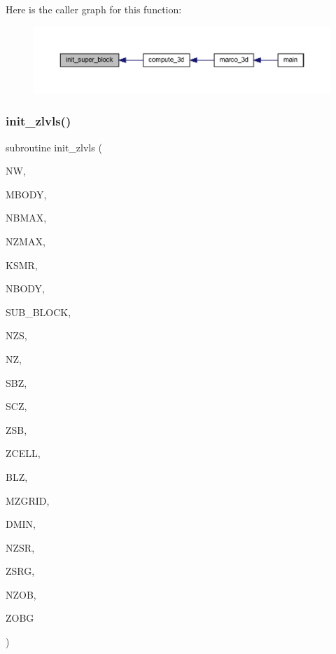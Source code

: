 Here is the caller graph for this function\+:
\nopagebreak
\begin{figure}[H]
\begin{center}
\leavevmode
\includegraphics[width=350pt]{Marco_8f90_ac268fba86b567389312bb1f5945bec19_icgraph}
\end{center}
\end{figure}
\mbox{\label{Marco_8f90_a4052ce4c8e8ce6ad657a5430196fb520}} 
\subsubsection{\texorpdfstring{init\+\_\+zlvls()}{init\_zlvls()}}
{\footnotesize\ttfamily subroutine init\+\_\+zlvls (\begin{DoxyParamCaption}\item[{integer, intent(in)}]{NW,  }\item[{integer, intent(in)}]{M\+B\+O\+DY,  }\item[{integer, intent(in)}]{N\+B\+M\+AX,  }\item[{integer, intent(in)}]{N\+Z\+M\+AX,  }\item[{integer, intent(in)}]{K\+S\+MR,  }\item[{integer, intent(in)}]{N\+B\+O\+DY,  }\item[{integer, dimension(mbody), intent(in)}]{S\+U\+B\+\_\+\+B\+L\+O\+CK,  }\item[{integer, intent(in)}]{N\+ZS,  }\item[{integer, dimension(nbmax,mbody), intent(in)}]{NZ,  }\item[{real, intent(in)}]{S\+BZ,  }\item[{real, intent(in)}]{S\+CZ,  }\item[{real, intent(in)}]{Z\+SB,  }\item[{real, dimension(nzmax,nbmax,mbody), intent(in)}]{Z\+C\+E\+LL,  }\item[{real, dimension(nbmax,mbody), intent(in)}]{B\+LZ,  }\item[{integer, intent(in)}]{M\+Z\+G\+R\+ID,  }\item[{real, intent(in)}]{D\+M\+IN,  }\item[{integer, intent(out)}]{N\+Z\+SR,  }\item[{real, dimension(2,mzgrid), intent(out)}]{Z\+S\+RG,  }\item[{integer, intent(out)}]{N\+Z\+OB,  }\item[{real, dimension(mzgrid), intent(out)}]{Z\+O\+BG }\end{DoxyParamCaption})}

